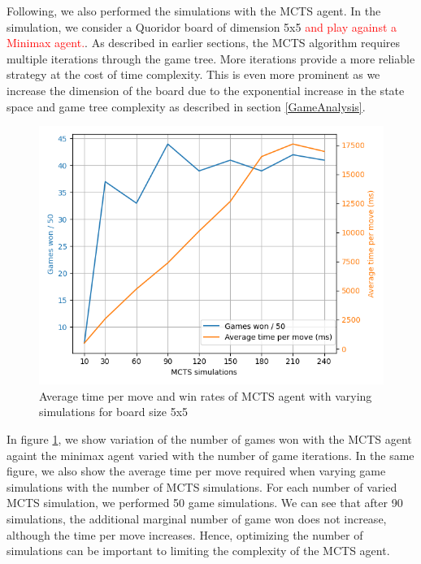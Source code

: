 Following, we also performed the simulations with the \gls{MCTS} agent. In the simulation, we consider a Quoridor board of dimension 5x5 \textcolor{red}{and play against a Minimax agent.}. As described in earlier sections, the \gls{MCTS} algorithm requires multiple iterations through the game tree. More iterations provide a more reliable strategy at the cost of time complexity. This is even more prominent as we increase the dimension of the board due to the exponential increase in the state space and game tree complexity as described in section \ref{GameAnalysis}.

\begin{figure}[!ht]
    \centering
    \includegraphics[width=0.7\linewidth]{../img/mcts_simulation_grid_search.png}
    \caption{Average time per move and win rates of MCTS agent with varying simulations for board size 5x5}
    \label{fig:mcts_simulations}
\end{figure}

In figure \ref{fig:mcts_simulations}, we show variation of the number of games won with the \gls{MCTS} agent againt the minimax agent varied with the number of game iterations. In the same figure, we also show the average time per move required when varying game simulations with the number of \gls{MCTS} simulations. For each number of varied \gls{MCTS} simulation, we performed 50 game simulations. We can see that after 90 simulations, the additional marginal number of game won does not increase, although the time per move increases. Hence, optimizing the number of simulations can be important to limiting the complexity of the \gls{MCTS} agent.

